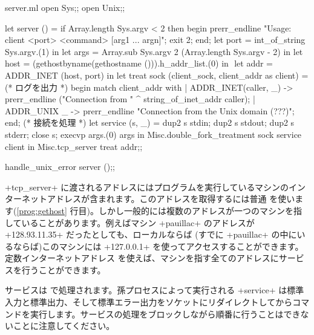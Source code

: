 %
\begin{listingcodefile}[style=numbers]{server.ml}
open Sys;;
open Unix;;

let server () =
  if Array.length Sys.argv < 2 then begin
    prerr_endline "Usage: client <port> <command> [arg1 ... argn]";
    exit 2;
  end;
  let port = int_of_string Sys.argv.(1) in
  let args = Array.sub Sys.argv 2 (Array.length Sys.argv - 2) in
  let host = (gethostbyname(gethostname ())).h_addr_list.(0) in $\label{prog:gethost}$
  let addr = ADDR_INET (host, port) in
  let treat sock (client_sock, client_addr as client) =
    (* ログを出力 *)
    begin match client_addr with
    | ADDR_INET(caller, _) ->
        prerr_endline ("Connection from " ^ string_of_inet_addr caller);
    | ADDR_UNIX _ ->
        prerr_endline "Connection from the Unix domain (???)";
    end;
    (* 接続を処理 *)
    let service (s, _) =
      dup2 s stdin; dup2 s stdout; dup2 s stderr; close s;
      execvp args.(0) args
    in
    Misc.double_fork_treatment sock service client in
  Misc.tcp_server treat addr;;

handle_unix_error server ();;
\end{listingcodefile}
%
\ml+tcp_server+ に渡されるアドレスにはプログラムを実行しているマシンのインターネットアドレスが含まれます。このアドレスを取得するには普通  を使います(\ref{prog:gethost} 行目)。しかし一般的には複数のアドレスが一つのマシンを指していることがあります。例えばマシン \ml+pauillac+ のアドレスが \ml+128.93.11.35+ だったとしても、ローカルならば (すでに \ml+pauillac+ の中にいるならば)このマシンには \ml+127.0.0.1+ を使ってアクセスすることができます。定数インターネットアドレス  を使えば、マシンを指す全てのアドレスにサービスを行うことができます。

サービスは  で処理されます。孫プロセスによって実行される \ml+service+ は標準入力と標準出力、そして標準エラー出力をソケットにリダイレクトしてからコマンドを実行します。サービスの処理をブロックしながら順番に行うことはできないことに注意してください。

